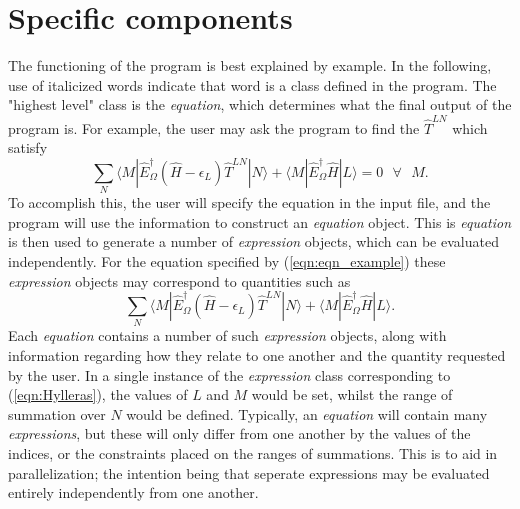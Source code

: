 \section{Specific components}
The functioning of the program is best explained by example. In the following,
use of italicized words indicate that word is a class defined in the program.
The "highest level" class is the \emph{equation}, which determines what the
final output of the program is. For example, the user may ask the program to find the 
$\hat{T}^{LN}$ which satisfy 
\begin{equation}
\sum_{N} 
\langle M | \hat{E}^{\dagger}_{\Omega} (\hat{H}-\epsilon_{L}) \hat{T}^{LN} | N \rangle  +
\langle M | \hat{E}^{\dagger}_{\Omega} \hat{H} | L  \rangle = 0 \text{ \ \ \ \ } \forall \text{ \ \ }  M . 
\label{eqn:eqn_example}
\end{equation}
\noindent To accomplish this, the user will specify the equation in the input file, and the 
program will use the information to construct an \emph{equation} object. This is \emph{equation}
is then used to generate a number of \emph{expression} objects, which can be evaluated independently. 
For the equation specified by (\ref{eqn:eqn_example}) these \emph{expression} objects
may correspond to quantities such as
\begin{equation}
\sum_{N} 
\langle M | \hat{E}^{\dagger}_{\Omega} (\hat{H}-\epsilon_{L}) \hat{T}^{LN} | N \rangle  +
\langle M | \hat{E}^{\dagger}_{\Omega} \hat{H} | L  \rangle.
\label{eqn:Hylleras}
\end{equation}
\noindent Each \emph{equation} contains a number of such \emph{expression} objects, along with
information regarding how they relate to one another and the quantity requested by the user.
In a single instance of the \emph{expression} class corresponding to (\ref{eqn:Hylleras}),
the values of $L$ and $M$  would be set, whilst the range of
summation over $N$ would be defined. Typically, an \emph{equation} will contain many \emph{expressions}, but
these will only differ from one another by the values of the indices, or the 
constraints placed on the ranges of summations. This is to aid in parallelization;
the intention being that seperate expressions may be evaluated entirely independently from one another.\\

